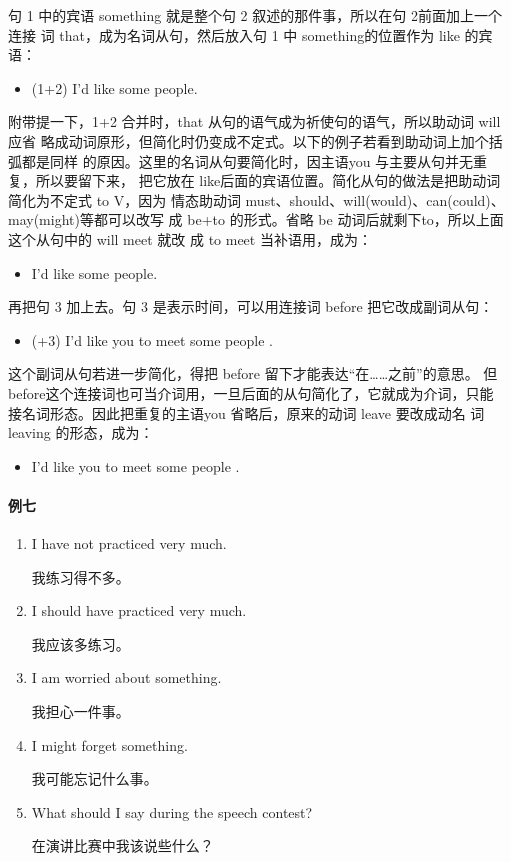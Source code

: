 句 1 中的宾语 something 就是整个句 2 叙述的那件事，所以在句 2前面加上一个连接
词 that，成为名词从句，然后放入句 1 中 something的位置作为 like 的宾语：
\begin{itemize}
\item (1+2) I'd like  some people.
\end{itemize}
附带提一下，1+2 合并时，that 从句的语气成为祈使句的语气，所以助动词 will应省
略成动词原形，但简化时仍变成不定式。以下的例子若看到助动词上加个括弧都是同样
的原因。这里的名词从句要简化时，因主语you 与主要从句并无重复，所以要留下来，
把它放在 like后面的宾语位置。简化从句的做法是把助动词简化为不定式 to V，因为
情态助动词 must、should、will(would)、can(could)、 may(might)等都可以改写
成 be+to 的形式。省略 be 动词后就剩下to，所以上面这个从句中的 will meet 就改
成 to meet 当补语用，成为：
\begin{itemize}
\item I'd like  some people.
\end{itemize}
再把句 3 加上去。句 3 是表示时间，可以用连接词 before 把它改成副词从句：
\begin{itemize}
\item (+3) I'd like you to meet some people .
\end{itemize}
这个副词从句若进一步简化，得把 before 留下才能表达“在……之前”的意思。
但 before这个连接词也可当介词用，一旦后面的从句简化了，它就成为介词，只能
接名词形态。因此把重复的主语you 省略后，原来的动词 leave 要改成动名
词 leaving 的形态，成为：
\begin{itemize}
\item I'd like you to meet some people .
\end{itemize}

\paragraph{例七}

\begin{enumerate}
\item I have not practiced very much.

  我练习得不多。
\item I should have practiced very much.

  我应该多练习。
\item I am worried about something.

  我担心一件事。
\item I might forget something.

  我可能忘记什么事。
\item What should I say during the speech contest?

  在演讲比赛中我该说些什么？
\end{enumerate}

